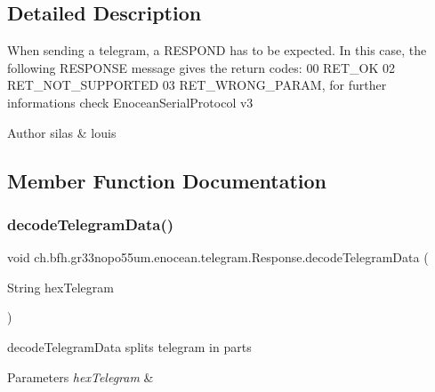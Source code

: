 \subsection{Detailed Description}
When sending a telegram, a R\+E\+S\+P\+O\+ND has to be expected. In this case, the following R\+E\+S\+P\+O\+N\+SE message gives the return codes\+: 00 R\+E\+T\+\_\+\+OK 02 R\+E\+T\+\_\+\+N\+O\+T\+\_\+\+S\+U\+P\+P\+O\+R\+T\+ED 03 R\+E\+T\+\_\+\+W\+R\+O\+N\+G\+\_\+\+P\+A\+R\+AM, for further informations check Enocean\+Serial\+Protocol v3

\begin{DoxyAuthor}{Author}
silas \& louis 
\end{DoxyAuthor}


\subsection{Member Function Documentation}
\hypertarget{classch_1_1bfh_1_1gr33nopo55um_1_1enocean_1_1telegram_1_1_response_ad39af2286654f5e0892ff9abe01eb1e2}{}\label{classch_1_1bfh_1_1gr33nopo55um_1_1enocean_1_1telegram_1_1_response_ad39af2286654f5e0892ff9abe01eb1e2} 
\subsubsection{\texorpdfstring{decode\+Telegram\+Data()}{decodeTelegramData()}}
{\footnotesize\ttfamily void ch.\+bfh.\+gr33nopo55um.\+enocean.\+telegram.\+Response.\+decode\+Telegram\+Data (\begin{DoxyParamCaption}\item[{String}]{hex\+Telegram }\end{DoxyParamCaption})}

decode\+Telegram\+Data splits telegram in parts


\begin{DoxyParams}{Parameters}
{\em hex\+Telegram} & \\
\hline
\end{DoxyParams}
\hypertarget{classch_1_1bfh_1_1gr33nopo55um_1_1enocean_1_1telegram_1_1_response_ad20303a12d6ff415c78a853b2eda2526}{}\label{classch_1_1bfh_1_1gr33nopo55um_1_1enocean_1_1telegram_1_1_response_ad20303a12d6ff415c78a853b2eda2526} 
